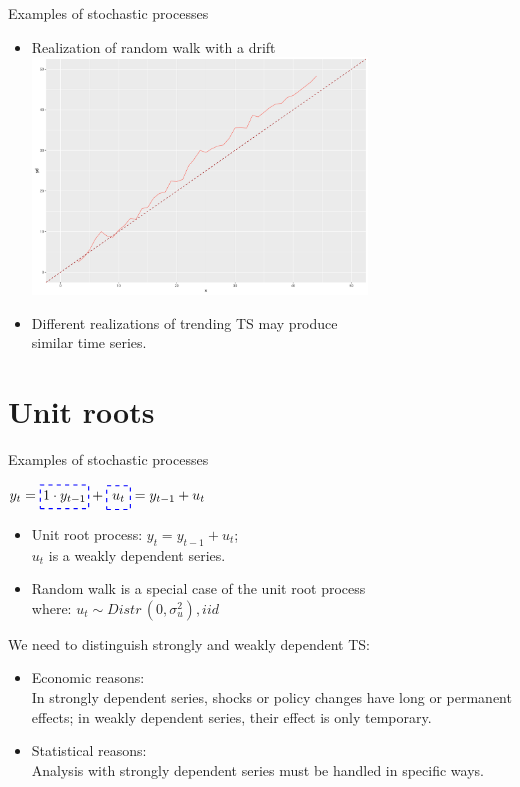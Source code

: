 \documentclass{beamer}
\newcommand*\boxedd[1]{\tikz[baseline=(char.base)]{
    \node[shape=rectangle, dashed, draw=blue, thick, inner sep=2pt, minimum size=0.6cm] (char) {#1};}}
\begin{document}
\begin{frame}{Examples of stochastic processes}
\begin{itemize}
\item Realization of random walk with a drift \\ 
\vspace{0.2cm}
\includegraphics[width=0.7\textwidth]{img/random_walk_drift.pdf}

\item Different realizations of trending TS may produce \\similar time series.
\end{itemize}
\end{frame}

\section{Unit roots}
\begin{frame}{Examples of stochastic processes}

$y_t = \boxedd{$1 \cdot y_{t-1}$} + \boxedd{$u_t$} = y_{t-1} + u_t$
\medskip
\begin{itemize}
\item Unit root process: $y_t = y_{t-1} + u_t$; \quad  \\
$u_t$ is a weakly dependent series.
\item Random walk is a special case of the unit root process \\where: $u_t \sim \textit{Distr} \, (0, \sigma_u^2), \textit{iid}$
\bigskip
\end{itemize}

We need to distinguish strongly and weakly dependent TS:
\begin{itemize}
\item Economic reasons: \\ In strongly dependent series, shocks or policy changes  have  long or permanent effects; in weakly dependent series, their effect  is only temporary.
\item Statistical reasons: \\ Analysis with strongly dependent series must be handled in specific ways.
\end{itemize}
\end{frame}
\end{document}
